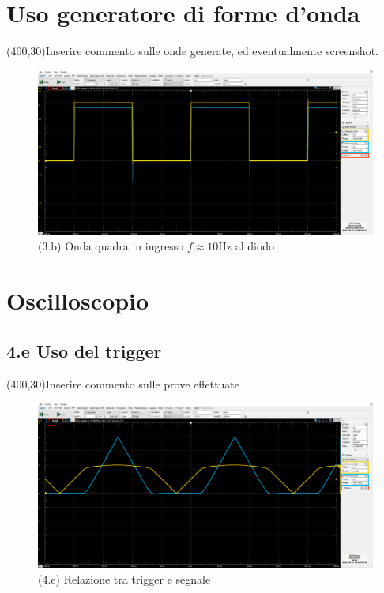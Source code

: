\documentclass[10pt,a4paper]{article}
\newcommand{\exn}{\phantom{xxx}}
\begin{document}
\section{Uso generatore di forme d'onda}
\exn 
\par
\vspace{0.5cm}
\framebox(400,30){Inserire commento sulle onde generate, ed eventualmente
screenshot.}
\begin{figure}[ht]
\centering
\includegraphics[scale=0.3]{sqwdiode}
\caption{(3.b) Onda quadra in ingresso $f \approx 10 \si{\Hz}$ al diodo}
\end{figure}
\section{Oscilloscopio}

\subsection*{4.e Uso del trigger}

\exn 
\par
\vspace{0.5cm}
\framebox(400,30){Inserire commento sulle prove effettuate }

\begin{figure}[ht]
\centering
\includegraphics[scale=0.3]{trgdiode_new}
\caption{(4.e) Relazione tra trigger e segnale}
\end{figure}
\end{document}
